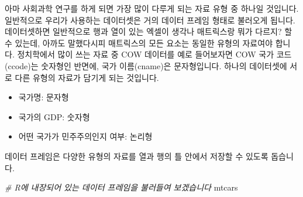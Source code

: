 \documentclass[]{book}
\newenvironment{Shaded}{\begin{snugshade}}{\end{snugshade}}
\newcommand{\CommentTok}[1]{\textcolor[rgb]{0.56,0.35,0.01}{\textit{#1}}}
\newcommand{\NormalTok}[1]{#1}
\providecommand{\tightlist}{%
  \setlength{\itemsep}{0pt}\setlength{\parskip}{0pt}}
\begin{document}
아마 사회과학 연구를 하게 되면 가장 많이 다루게 되는 자료 유형 중 하나일 것입니다. 일반적으로 우리가 사용하는 데이터셋은 거의 데이터 프레임 형태로 불러오게 됩니다. 데이터셋하면 일반적으로 행과 열이 있는 엑셀이 생각나 매트릭스랑 뭐가 다르지? 할 수 있는데, 아까도 말했다시피 매트릭스의 모든 요소는 동일한 유형의 자료여야 합니다. 정치학에서 많이 쓰는 자료 중 COW 데이터를 예로 들어보자면 COW 국가 코드(ccode)는 숫자형인 반면에, 국가 이름(cname)은 문자형입니다. 하나의 데이터셋에 서로 다른 유형의 자료가 담기게 되는 것입니다.

\begin{itemize}
\tightlist
\item
  국가명: 문자형
\item
  국가의 GDP: 숫자형
\item
  어떤 국가가 민주주의인지 여부: 논리형
\end{itemize}

데이터 프레임은 다양한 유형의 자료를 열과 행의 틀 안에서 저장할 수 있도록 돕습니다.

\begin{Shaded}
\begin{Highlighting}[]
\CommentTok{# R에 내장되어 있는 데이터 프레임을 불러들여 보겠습니다}
\NormalTok{mtcars}
\end{Highlighting}
\end{Shaded}
\end{document}
